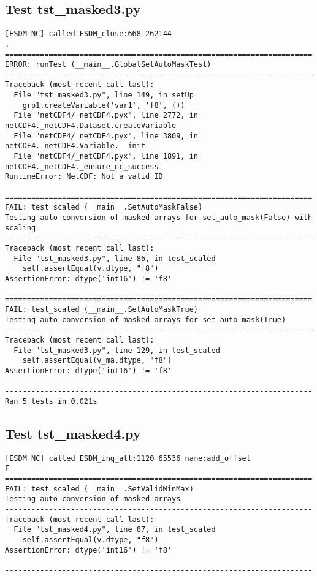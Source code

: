 \subsection{Test tst\_masked3.py}

\begin{verbatim}
[ESDM NC] called ESDM_close:668 262144
.
======================================================================
ERROR: runTest (__main__.GlobalSetAutoMaskTest)
----------------------------------------------------------------------
Traceback (most recent call last):
  File "tst_masked3.py", line 149, in setUp
    grp1.createVariable('var1', 'f8', ())
  File "netCDF4/_netCDF4.pyx", line 2772, in netCDF4._netCDF4.Dataset.createVariable
  File "netCDF4/_netCDF4.pyx", line 3809, in netCDF4._netCDF4.Variable.__init__
  File "netCDF4/_netCDF4.pyx", line 1891, in netCDF4._netCDF4._ensure_nc_success
RuntimeError: NetCDF: Not a valid ID

======================================================================
FAIL: test_scaled (__main__.SetAutoMaskFalse)
Testing auto-conversion of masked arrays for set_auto_mask(False) with scaling
----------------------------------------------------------------------
Traceback (most recent call last):
  File "tst_masked3.py", line 86, in test_scaled
    self.assertEqual(v.dtype, "f8")
AssertionError: dtype('int16') != 'f8'

======================================================================
FAIL: test_scaled (__main__.SetAutoMaskTrue)
Testing auto-conversion of masked arrays for set_auto_mask(True)
----------------------------------------------------------------------
Traceback (most recent call last):
  File "tst_masked3.py", line 129, in test_scaled
    self.assertEqual(v_ma.dtype, "f8")
AssertionError: dtype('int16') != 'f8'

----------------------------------------------------------------------
Ran 5 tests in 0.021s
\end{verbatim}

\subsection{Test tst\_masked4.py}

\begin{verbatim}
[ESDM NC] called ESDM_inq_att:1120 65536 name:add_offset
F
======================================================================
FAIL: test_scaled (__main__.SetValidMinMax)
Testing auto-conversion of masked arrays
----------------------------------------------------------------------
Traceback (most recent call last):
  File "tst_masked4.py", line 87, in test_scaled
    self.assertEqual(v.dtype, "f8")
AssertionError: dtype('int16') != 'f8'

----------------------------------------------------------------------
\end{verbatim}

